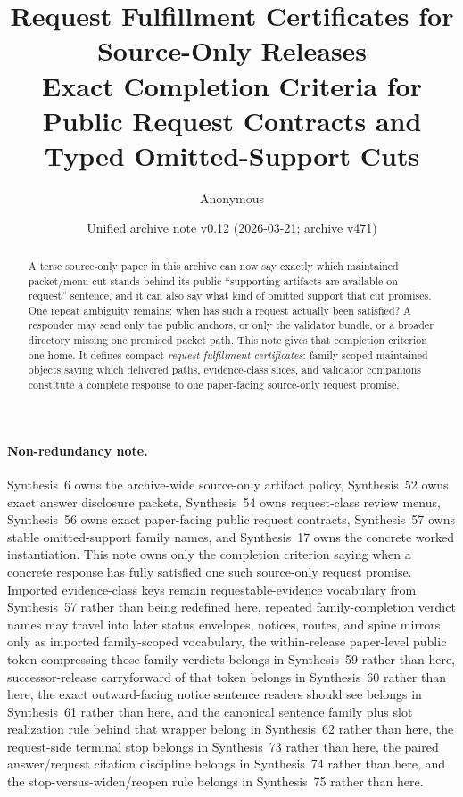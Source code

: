 \documentclass[11pt]{article}
\title{Request Fulfillment Certificates for Source-Only Releases\\\large Exact Completion Criteria for Public Request Contracts and Typed Omitted-Support Cuts}
\author{Anonymous}
\date{Unified archive note v0.12 (2026-03-21; archive v471)}
\begin{document}
\maketitle

\begin{abstract}
A terse source-only paper in this archive can now say exactly which maintained packet/menu cut stands behind its public ``supporting artifacts are available on request'' sentence, and it can also say what kind of omitted support that cut promises. One repeat ambiguity remains: when has such a request actually been satisfied? A responder may send only the public anchors, or only the validator bundle, or a broader directory missing one promised packet path. This note gives that completion criterion one home. It defines compact \emph{request fulfillment certificates}: family-scoped maintained objects saying which delivered paths, evidence-class slices, and validator companions constitute a complete response to one paper-facing source-only request promise.
\end{abstract}

\paragraph{Non-redundancy note.}
Synthesis~6 owns the archive-wide source-only artifact policy, Synthesis~52 owns exact answer disclosure packets, Synthesis~54 owns request-class review menus, Synthesis~56 owns exact paper-facing public request contracts, Synthesis~57 owns stable omitted-support family names, and Synthesis~17 owns the concrete worked instantiation.\cite{series:artifactpolicy,series:challengeanswerdisclosurepackets,series:challengeanswerreviewmenus,series:publicrequestcontracts,series:requestableevidenceclasses,series:workedexample}
This note owns only the completion criterion saying when a concrete response has fully satisfied one such source-only request promise. Imported evidence-class keys remain requestable-evidence vocabulary from Synthesis~57 rather than being redefined here, repeated family-completion verdict names may travel into later status envelopes, notices, routes, and spine mirrors only as imported family-scoped vocabulary, the within-release paper-level public token compressing those family verdicts belongs in Synthesis~59 rather than here, successor-release carryforward of that token belongs in Synthesis~60 rather than here, the exact outward-facing notice sentence readers should see belongs in Synthesis~61 rather than here, and the canonical sentence family plus slot realization rule behind that wrapper belong in Synthesis~62 rather than here, the request-side terminal stop belongs in Synthesis~73 rather than here, the paired answer/request citation discipline belongs in Synthesis~74 rather than here, and the stop-versus-widen/reopen rule belongs in Synthesis~75 rather than here.
\end{document}
